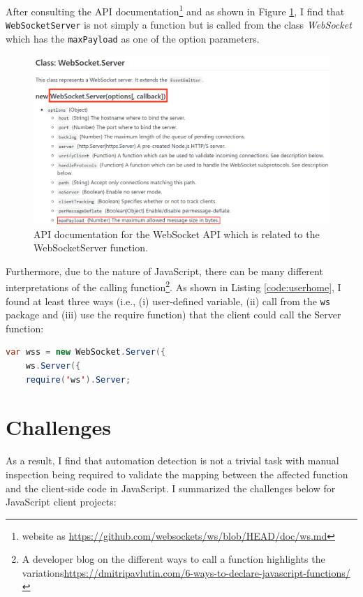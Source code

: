 After consulting the API documentation\footnote{website as \url{https://github.com/websockets/ws/blob/HEAD/doc/ws.md}} and as shown in Figure \ref{fig:codeWSCode}, I find that 
\texttt{WebSocketServer} is not simply a function but is called from the class \textit{WebSocket} which has the \texttt{maxPayload} as one of the option parameters.

\begin{figure}[t]
\centering
\includegraphics[width=1\textwidth]{images/wcDoc.PNG}
\caption{API documentation for the WebSocket API which is related to the WebSocketServer function.}
\label{fig:codeWSCode}
\end{figure}

Furthermore, due to the nature of JavaScript, there can be many different interpretations of the calling function\footnote{A developer blog on the different ways to call a function highlights the variations\url{https://dmitripavlutin.com/6-ways-to-declare-javascript-functions/}}. 
As shown in Listing \ref{code:userhome}, I found at least three ways (i.e., (i) user-defined variable, (ii) call from the \texttt{ws} package and (iii) use the require function) that the client could call the Server function:
\newline
\begin{lstlisting}[language=Java,
caption={Three ways that a client project can call the WebSocketServer function. This is through the WebSocket API.},
label=code:userhome]
    var wss = new WebSocket.Server({ 
    ws.Server({ 
    require('ws').Server; 
\end{lstlisting}

\section{Challenges}
As a result, I find that automation detection is not a trivial task with manual inspection being required to validate the mapping between the affected function and the client-side code in JavaScript.
I summarized the challenges below for JavaScript client projects:

